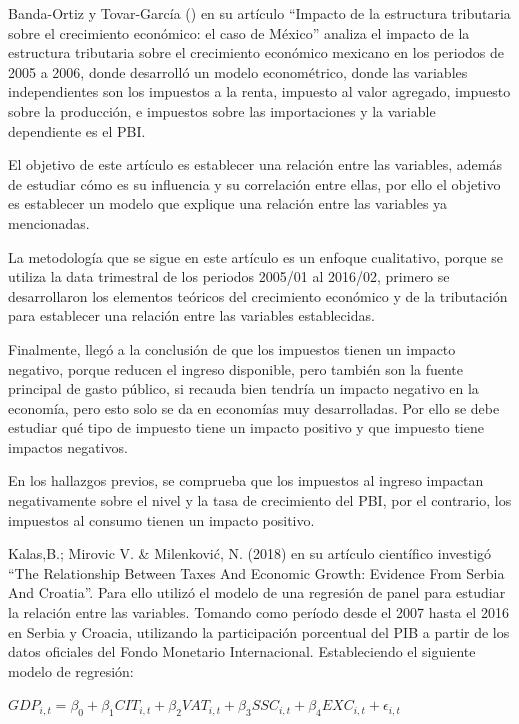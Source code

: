 \documentclass[
  jou,
  floatsintext,
  longtable,
  a4paper,
  nolmodern,
  notxfonts,
  notimes,
  12pt,
  colorlinks=true,linkcolor=blue,citecolor=blue,urlcolor=blue]{apa7}
\begin{document}
Banda-Ortiz y Tovar-García
() en su artículo ``Impacto
de la estructura tributaria sobre el crecimiento económico: el caso de
México'' analiza el impacto de la estructura tributaria sobre el
crecimiento económico mexicano en los periodos de 2005 a 2006, donde
desarrolló un modelo econométrico, donde las variables independientes
son los impuestos a la renta, impuesto al valor agregado, impuesto sobre
la producción, e impuestos sobre las importaciones y la variable
dependiente es el PBI.

El objetivo de este artículo es establecer una relación entre las
variables, además de estudiar cómo es su influencia y su correlación
entre ellas, por ello el objetivo es establecer un modelo que explique
una relación entre las variables ya mencionadas.

La metodología que se sigue en este artículo es un enfoque cualitativo,
porque se utiliza la data trimestral de los periodos 2005/01 al 2016/02,
primero se desarrollaron los elementos teóricos del crecimiento
económico y de la tributación para establecer una relación entre las
variables establecidas.

Finalmente, llegó a la conclusión de que los impuestos tienen un impacto
negativo, porque reducen el ingreso disponible, pero también son la
fuente principal de gasto público, si recauda bien tendría un impacto
negativo en la economía, pero esto solo se da en economías muy
desarrolladas. Por ello se debe estudiar qué tipo de impuesto tiene un
impacto positivo y que impuesto tiene impactos negativos.

En los hallazgos previos, se comprueba que los impuestos al ingreso
impactan negativamente sobre el nivel y la tasa de crecimiento del PBI,
por el contrario, los impuestos al consumo tienen un impacto positivo.

Kalas,B.; Mirovic V. \& Milenković, N. (2018) en su artículo científico
investigó ``The Relationship Between Taxes And Economic Growth: Evidence
From Serbia And Croatia''. Para ello utilizó el modelo de una regresión
de panel para estudiar la relación entre las variables. Tomando como
período desde el 2007 hasta el 2016 en Serbia y Croacia, utilizando la
participación porcentual del PIB a partir de los datos oficiales del
Fondo Monetario Internacional. Estableciendo el siguiente modelo de
regresión:

\(GDP_{i, t} = \beta_{0} + \beta_{1}CIT_{i, t}+ \beta_{2}VAT_{i, t} + \beta_{3}SSC_{i, t} + \beta_{4}EXC_{i, t} + \epsilon_{i, t}\)
\end{document}
